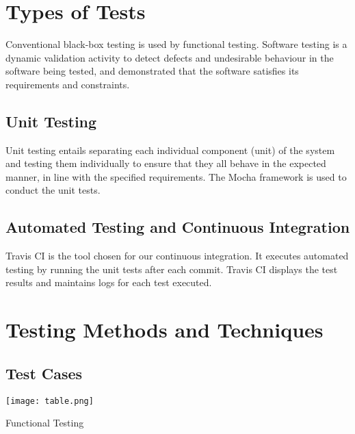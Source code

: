 \documentclass[10pt]{article}
\begin{document}
\newpage
\section{Types of Tests}

\hspace{5cm}

Conventional black-box testing is used by functional testing.
Software testing is a dynamic validation activity to detect defects and undesirable behaviour in the software being tested, and demonstrated that the software satisfies its requirements and constraints.

\hspace{5cm}


\subsection{Unit Testing}

 Unit testing entails separating each individual component (unit) of the system and testing them individually to ensure that they all behave in the expected manner, in line with the specified requirements. The Mocha framework is used to conduct the unit tests.


\hspace{5cm}

 \subsection{Automated Testing and Continuous Integration}
 Travis CI is the tool chosen for our continuous integration. 
It executes automated testing by running the unit tests after each commit.
Travis CI displays the test results and maintains logs for each test executed.
 
  \newpage
 \section{Testing Methods and Techniques}
 
 \subsection{Test Cases}
 \hspace{5cm}
 


\texttt{[image: table.png]}
\caption{Functional Testing}
    
\hspace{5cm}
 
\end{document}

